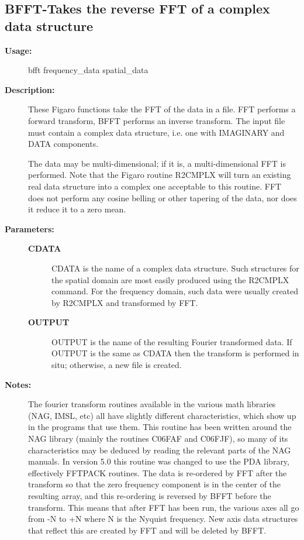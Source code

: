 \subsection{BFFT-\label{BFFT}Takes the reverse FFT of a complex data structure}
\begin{description}

\item [{\bf Usage:}]
 bfft frequency_data spatial_data

\item [{\bf Description:}]
 These Figaro functions take the FFT of the data in a file.
 FFT performs a forward transform, BFFT performs an inverse
 transform.  The input file must contain a complex data
 structure, i.e. one with IMAGINARY and DATA components.

 The data may be multi-dimensional; if it is, a multi-dimensional
 FFT is performed.  Note that the Figaro routine R2CMPLX will turn
 an existing real data structure into a complex one acceptable to
 this routine. FFT does not perform any cosine belling or other
 tapering of the data, nor does it reduce it to a zero mean.

\item [{\bf Parameters:}]
\begin{description}
\item [{\bf CDATA}]
 CDATA is the name of a complex data structure. Such structures
 for the spatial domain are most easily produced using the
 R2CMPLX command. For the frequency domain, such data were
 usually created by R2CMPLX and transformed by FFT.
\item [{\bf OUTPUT}]
 OUTPUT is the name of the resulting Fourier transformed data.
 If OUTPUT is the same as CDATA then the transform is performed
 in situ; otherwise, a new file is created.
\end{description}

\item [{\bf Notes:}]
 The fourier transform routines available in the various math
 libraries (NAG, IMSL, etc) all have slightly different
 characteristics, which show up in the programs that use them.
 This routine has been written around the NAG library (mainly
 the routines C06FAF and C06FJF), so many of its characteristics
 may be deduced by reading the relevant parts of the NAG manuals.
 In version 5.0 this routine was changed to use the PDA library,
 effectively FFTPACK routines. The data is re-ordered by FFT after
 the transform so that the zero frequency component is in the
 center of the resulting array, and this re-ordering is reversed by
 BFFT before the transform. This means that after FFT has been run,
 the various axes all go from -N to +N where N is the Nyquist
 frequency.  New axis data structures that reflect this are created
 by FFT and will be deleted by BFFT.


\end{description}
